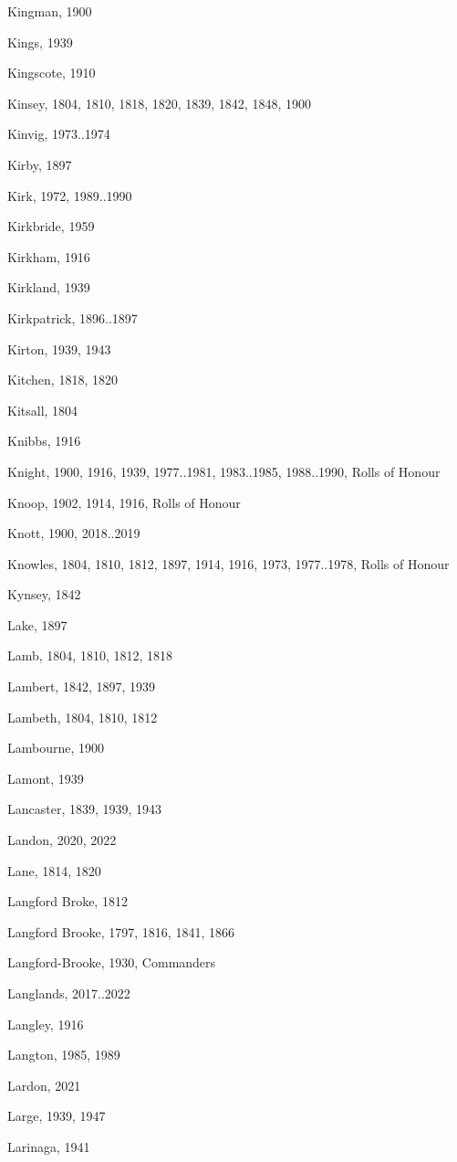 \begin{theindex}
\item Kingman, 1900
\item Kings, 1939
\item Kingscote, 1910
\item Kinsey, 1804, 1810, 1818, 1820, 1839, 1842, 1848, 1900
\item Kinvig, 1973..1974
\item Kirby, 1897
\item Kirk, 1972, 1989..1990
\item Kirkbride, 1959
\item Kirkham, 1916
\item Kirkland, 1939
\item Kirkpatrick, 1896..1897
\item Kirton, 1939, 1943
\item Kitchen, 1818, 1820
\item Kitsall, 1804
\item Knibbs, 1916
\item Knight, 1900, 1916, 1939, 1977..1981, 1983..1985, 1988..1990, Rolls of Honour
\item Knoop, 1902, 1914, 1916, Rolls of Honour
\item Knott, 1900, 2018..2019
\item Knowles, 1804, 1810, 1812, 1897, 1914, 1916, 1973, 1977..1978, Rolls of Honour
\item Kynsey, 1842
\item Lake, 1897
\item Lamb, 1804, 1810, 1812, 1818
\item Lambert, 1842, 1897, 1939
\item Lambeth, 1804, 1810, 1812
\item Lambourne, 1900
\item Lamont, 1939
\item Lancaster, 1839, 1939, 1943
\item Landon, 2020, 2022
\item Lane, 1814, 1820
\item Langford Broke, 1812
\item Langford Brooke, 1797, 1816, 1841, 1866
\item Langford-Brooke, 1930, Commanders
\item Langlands, 2017..2022
\item Langley, 1916
\item Langton, 1985, 1989
\item Lardon, 2021
\item Large, 1939, 1947
\item Larinaga, 1941

\end{theindex}
